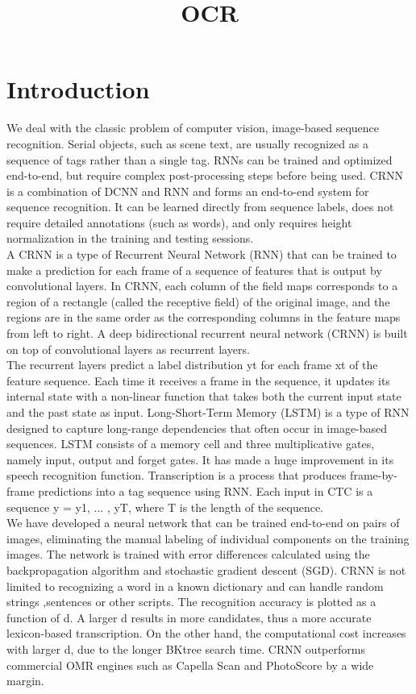 \documentclass{article}
\title{OCR}
\begin{document}
\section{Introduction}

We deal with the classic problem of computer vision, image-based sequence recognition. Serial objects, such as scene text, are usually recognized as a sequence of tags rather than a single tag. RNNs can be trained and optimized end-to-end, but require complex post-processing steps before being used. CRNN is a combination of DCNN and RNN and forms an end-to-end system for sequence recognition. It can be learned directly from sequence labels, does not require detailed annotations (such as words), and only requires height normalization in the training and testing sessions.\\

A CRNN is a type of Recurrent Neural Network (RNN) that can be trained to make a prediction for each frame of a sequence of features that is output by convolutional layers. In CRNN, each column of the field maps corresponds to a region of a rectangle (called the receptive field) of the original image, and the regions are in the same order as the corresponding columns in the feature maps from left to right. A deep bidirectional recurrent neural network (CRNN) is built on top of convolutional layers as recurrent layers.\\

The recurrent layers predict a label distribution yt for each frame xt of the feature sequence. Each time it receives a frame in the sequence, it updates its internal state with a non-linear function that takes both the current input state and the past state as input. Long-Short-Term Memory (LSTM) is a type of RNN designed to capture long-range dependencies that often occur in image-based sequences. LSTM consists of a memory cell and three multiplicative gates, namely input, output and forget gates. It has made a huge improvement in its speech recognition function.
Transcription is a process that produces frame-by-frame predictions into a tag sequence using RNN. Each input in CTC is a sequence y = y1, ... , yT, where T is the length of the sequence.\\

We have developed a neural network that can be trained end-to-end on pairs of images, eliminating the manual labeling of individual components on the training images. The network is trained with error differences calculated using the backpropagation algorithm and stochastic gradient descent (SGD).
CRNN is not limited to recognizing a word in a known dictionary and can handle random strings ,sentences or other scripts.
The recognition accuracy is plotted as a function of d. A larger d results in more candidates, thus a more accurate lexicon-based transcription. On the other hand, the computational cost increases with larger d, due to the longer BKtree search time. CRNN outperforms commercial OMR engines such as Capella Scan and PhotoScore by a wide margin.\\
\end{document}
